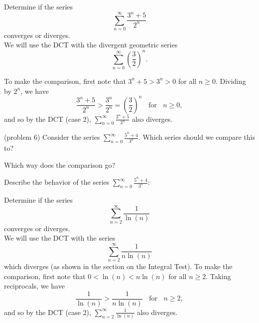 \documentclass[handout]{ximera}
\begin{document}
\begin{example}[example 6] %
Determine if the series 
\[
\sum_{n=0}^\infty \frac{3^n + 5}{2^n}
\]
 converges or diverges.\\
We will use the DCT with the divergent geometric series 
\[
\sum_{n=0}^\infty \left(\frac32\right)^n.
\]

To make the comparison, first note that $3^n + 5 > 3^n > 0$ for all $n \geq 0$. Dividing by $2^n$, we have 
\[
\frac{3^n + 5}{2^n} > \frac{3^n}{2^n} = \left(\frac32\right)^n \;\; \text{ for } \;\; n \geq 0,
\]
and so by the DCT (case 2), $\sum_{n=0}^\infty \frac{2^n + 5}{3^n}$ also diverges.
\end{example}


\begin{problem}(problem 6)
Consider the series $\displaystyle{\sum_{n=0}^\infty \frac{5^n + 4}{3^n}}$.
Which series should we compare this to?

\begin{multipleChoice}
\end{multipleChoice}

Which way does the comparison go?
\begin{multipleChoice}
\end{multipleChoice}

Describe the behavior of the series $\sum_{n=0}^\infty \frac{5^n + 4}{3^n}:$
\begin{multipleChoice}
\end{multipleChoice}

\end{problem}



\begin{example}[example 7] %
Determine if the series 
\[
\sum_{n=2}^\infty \frac{1}{\ln(n)}
\]
converges or diverges.\\
We will use the DCT with the series 
\[
\sum_{n=2}^\infty \frac{1}{n\ln(n)}
\]
 which diverges (as shown in the section on the Integral Test).
To make the comparison, first note that $0 < \ln(n) < n\ln(n)$ for all $n \geq 2$. Taking reciprocals, we have 
\[
\frac{1}{\ln(n)} > \frac{1}{n\ln(n)}  \;\; \text{ for } \;\; n \geq 2,
\]
and so by the DCT (case 2), $\sum_{n=2}^\infty \frac{1}{\ln(n)}$ also diverges.
\end{example}
\end{document}
